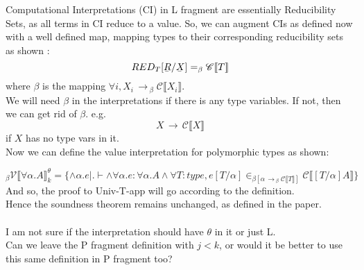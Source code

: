 \documentclass[12pt]{article}
\author{Ankit Kumar}
\newcommand{\ub}[1]{\underaccent{\bar}{#1}}
\newcommand{\arr}{\ensuremath{\,\rightarrow\,}}
\begin{document}
Computational Interpretations (CI) in L fragment are essentially
Reducibility Sets, as all terms in CI reduce to a value. So, we can
augment CIs as defined now with a well defined map, mapping types to
their corresponding reducibility sets as shown :
$$
RED_T[\ub{R}/\ub{X}] = _{\beta}\mathscr{C}\llbracket T \rrbracket
$$
where $\beta$ is the mapping $\forall i, X_i \arr
_\beta\mathscr{C}\llbracket X_i \rrbracket$.\\
We will need $\beta$ in the interpretations if there is any type
variables. If not, then we can get rid of $\beta$. e.g. 
$$
X \arr \mathscr{C}\llbracket X \rrbracket
$$
if $X$ has no type vars in it.\\

Now we can define the value interpretation for polymorphic types as
shown:

$$
_\beta\mathscr{V}\llbracket \forall \alpha.A \rrbracket^\theta_k =
\{\wedge \alpha.e| . \vdash \wedge \forall \alpha.e : \forall \alpha.A
\wedge \forall T:type, e[T/\alpha] \in _{\beta[\alpha \arr
  _\beta\mathscr{C}\llbracket T \rrbracket]}\mathscr{C}\llbracket [T/\alpha]A
\rrbracket \}
$$
And so, the proof to Univ-T-app will go according to the definition.\\
Hence the soundness theorem remains unchanged, as defined in the
paper.\\
\\
I am not sure if the interpretation should have $\theta$ in it or just
L.\\
Can we leave the P fragment definition with $j<k$, or would it be better
to use this same definition in P fragment too?
\end{document}
